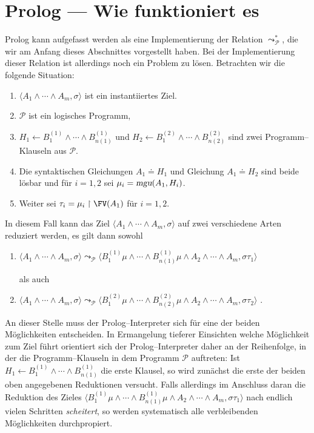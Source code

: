 \section{Prolog --- Wie funktioniert es}
Prolog kann aufgefasst werden als eine Implementierung der Relation
$\leadsto_\mathcal{P}^*$, die wir am Anfang dieses Abschnittes vorgestellt haben.  Bei der
Implementierung dieser Relation ist allerdings noch ein Problem zu l\"{o}sen.
Betrachten wir die folgende Situation:
\begin{enumerate}
\item $\langle A_1 \wedge \cdots \wedge A_m, \sigma \rangle$ ist ein instantiiertes Ziel.
\item $\mathcal{P}$ ist ein logisches Programm,
\item $H_1 \leftarrow B^{(1)}_1 \wedge \cdots \wedge B^{(1)}_{n(1)}$ und
      $H_2 \leftarrow B^{(2)}_1 \wedge \cdots \wedge B^{(2)}_{n(2)}$ 
      sind zwei   Programm--Klauseln aus $\mathcal{P}$.
\item Die syntaktischen Gleichungen $A_1 \doteq H_1$ und
      Gleichung $A_1 \doteq H_2$ sind beide l\"{o}sbar und f\"{u}r $i=1,2$ sei $\mu_i = \textsl{mgu}(A_1, H_i)$.
\item Weiter sei $\tau_i = \mu_i \restriction \FV(A_1)$ f\"{u}r $i=1,2$.
\end{enumerate}
In diesem Fall kann das Ziel  $\langle A_1 \wedge \cdots \wedge A_m, \sigma \rangle$ auf
zwei verschiedene Arten reduziert werden, es gilt dann sowohl
\begin{enumerate}
\item $\big\langle A_1 \wedge \cdots \wedge A_m, \sigma \big\rangle \leadsto_\mathcal{P} \big\langle B^{(1)}_1\mu \wedge \cdots \wedge B^{(1)}_{n(1)}\mu \wedge A_2 \wedge \cdots  \wedge A_m, \sigma\tau_1 \big\rangle$ 

      als auch
\item $\big\langle A_1 \wedge \cdots \wedge A_m, \sigma \big\rangle \leadsto_\mathcal{P} \big\langle B^{(2)}_1\mu \wedge \cdots \wedge B^{(2)}_{n(2)}\mu \wedge A_2 \wedge \cdots \wedge A_m, \sigma\tau_2 \big\rangle$ .
\end{enumerate}
An dieser Stelle muss der Prolog--Interpreter sich f\"{u}r eine der beiden M\"{o}glichkeiten
entscheiden.  In Ermangelung tieferer Einsichten welche M\"{o}glichkeit zum Ziel f\"{u}hrt
orientiert sich der Prolog--Interpreter daher an der Reihenfolge, in der die
Programm--Klauseln in dem Programm $\mathcal{P}$ auftreten: Ist 
$H_1 \leftarrow B^{(1)}_1 \wedge \cdots \wedge B^{(1)}_{n(1)}$ die erste Klausel, so wird
 zun\"{a}chst die erste der beiden oben angegebenen Reduktionen versucht.
 Falls allerdings im Anschluss daran die Reduktion des Zieles
$\big\langle B^{(1)}_1\mu \wedge \cdots \wedge B^{(1)}_{n(1)}\mu \wedge A_2 \wedge \cdots  \wedge A_m, \sigma\tau_1 \big\rangle$
 nach endlich vielen Schritten \emph{scheitert}, so werden systematisch alle
verbleibenden M\"{o}glichkeiten durchpropiert.

